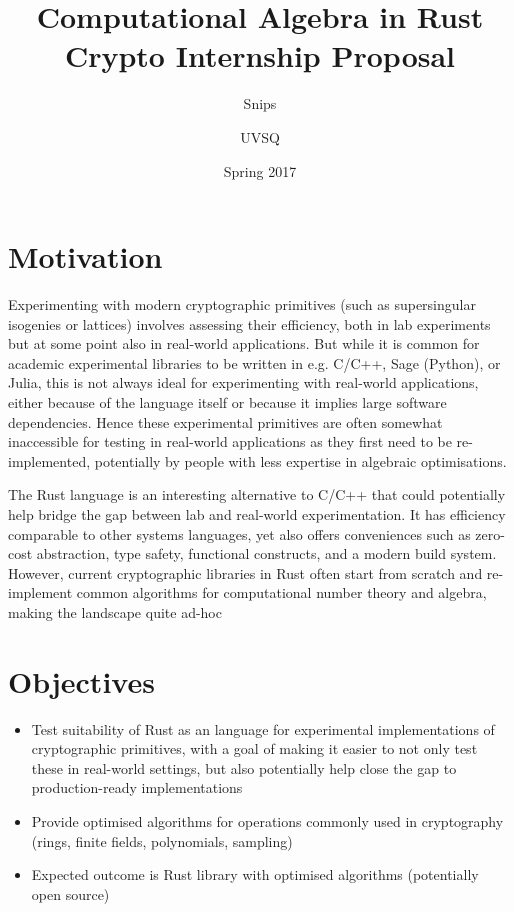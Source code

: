 \documentclass{article}
\title{Computational Algebra in Rust \\ {\large Crypto Internship Proposal}}
\author{{\small Snips} \and {\small UVSQ}}
\date{Spring 2017}
\begin{document}
\maketitle

\section*{Motivation}
Experimenting with modern cryptographic primitives (such as supersingular isogenies or lattices) involves assessing their efficiency, both in lab experiments but at some point also in real-world applications. But while it is common for academic experimental libraries to be written in e.g. C/C++, Sage (Python), or Julia, this is not always ideal for experimenting with real-world applications, either because of the language itself or because it implies large software dependencies. Hence these experimental primitives are often somewhat inaccessible for testing in real-world applications as they first need to be re-implemented, potentially by people with less expertise in algebraic optimisations. 

The Rust language is an interesting alternative to C/C++ that could potentially help bridge the gap between lab and real-world experimentation. It has efficiency comparable to other systems languages, yet also offers conveniences such as zero-cost abstraction, type safety, functional constructs, and a modern build system. However, current cryptographic libraries in Rust often start from scratch and re-implement common algorithms for computational number theory and algebra, making the landscape quite ad-hoc


\section*{Objectives}
\begin{itemize}
\item Test suitability of Rust as an language for experimental implementations of cryptographic primitives, with a goal of making it easier to not only test these in real-world settings, but also potentially help close the gap to production-ready implementations
\item Provide optimised algorithms for operations commonly used in cryptography (rings, finite fields, polynomials, sampling)
\item Expected outcome is Rust library with optimised algorithms (potentially open source)
\end{itemize}
\end{document}
